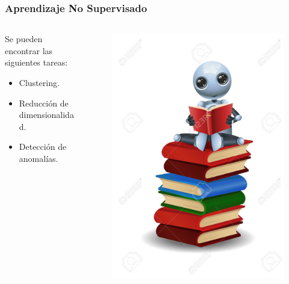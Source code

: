 \documentclass[10pt]{beamer}
\begin{document}
\begin{frame}
    \frametitle{Aprendizaje No Supervisado}
    \begin{columns}
        \begin{column}{0.5\textwidth}
            Se pueden encontrar las siguientes tareas:
          \begin{itemize}
              \item Clustering.
              \item Reducción de dimensionalidad.
              \item Detección de anomalías.
          \end{itemize}
        \end{column}
        \begin{column}{0.5\textwidth}
          \begin{figure}[!h] 
            \centering
            \includegraphics[width=1\textwidth]{img/robot2}
          \end{figure}  
        \end{column}
      \end{columns}

\end{frame}
\end{document}
